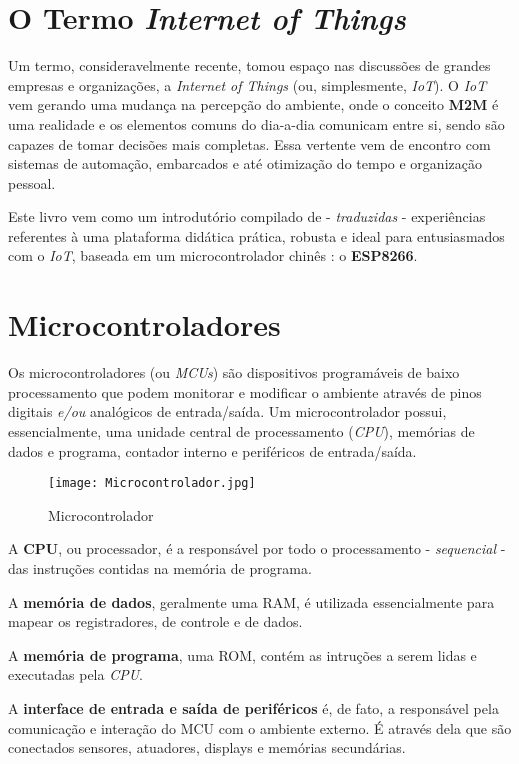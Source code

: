 \documentclass[
	11pt,				%
	openright,			%
	twoside,			%
	a5paper,			%
	english,			%
	french,				%
	spanish,			%
	brazil,				%
	sumario=tradicional
]{abntex2}
\begin{document}
\section{O Termo \textit{Internet of Things}}

Um termo, consideravelmente recente, tomou espaço nas discussões de grandes empresas e organizações, a \textit{Internet of Things} (ou, simplesmente, \textit{IoT}). O \textit{IoT} vem gerando uma mudança na percepção do ambiente, onde o conceito \textbf{\textsf{M2M}} é uma realidade e os elementos comuns do dia-a-dia comunicam entre si, sendo são capazes de tomar decisões mais completas. Essa vertente vem de encontro com sistemas de automação, embarcados e até otimização do tempo e organização pessoal.

Este livro vem como um introdutório compilado de - \textit{traduzidas} - experiências referentes à uma plataforma didática prática, robusta e ideal para entusiasmados com o \textit{IoT}, baseada em um microcontrolador chinês : o  \textsf{\textbf{ESP8266}}.

\section{Microcontroladores}

Os microcontroladores (ou \textit{MCUs}) são dispositivos programáveis de baixo processamento que podem monitorar e modificar o ambiente através de pinos digitais \textit{e/ou} analógicos de entrada/saída. Um microcontrolador possui, essencialmente, uma unidade central de processamento (\textit{CPU}), memórias de dados e programa, contador interno e periféricos de entrada/saída.

\begin{figure}[ht]
    \centering
    \texttt{[image: Microcontrolador.jpg]}
    \caption{Microcontrolador}
    \label{MCU}
\end{figure}

A \textsf{\textbf{CPU}}, ou processador, é a responsável por todo o processamento - \textit{sequencial} -  das instruções contidas na memória de programa.

A \textbf{\textsf{memória de dados}},  geralmente uma RAM, é utilizada essencialmente
para mapear os registradores, de controle e de dados.

A \textbf{\textsf{memória de programa}}, uma ROM, contém as intruções a serem lidas e executadas pela \textit{CPU}.

A \textbf{\textsf{interface de entrada e saída de periféricos}} é, de fato, a responsável pela comunicação e interação do MCU com o ambiente externo. É através dela que são conectados sensores, atuadores, displays e memórias secundárias.
\end{document}

